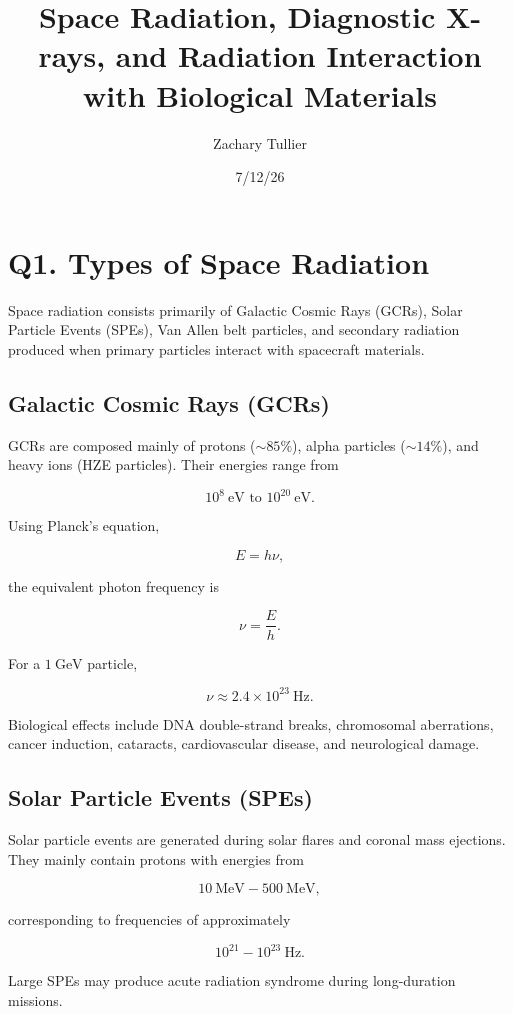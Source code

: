 \documentclass[12pt]{article}
\title{Space Radiation, Diagnostic X-rays, and Radiation Interaction with Biological Materials}
\author{Zachary Tullier}
\date{7/12/26}
\begin{document}
\maketitle

\section*{Q1. Types of Space Radiation}

Space radiation consists primarily of Galactic Cosmic Rays (GCRs), Solar Particle Events (SPEs), Van Allen belt particles, and secondary radiation produced when primary particles interact with spacecraft materials.

\subsection*{Galactic Cosmic Rays (GCRs)}

GCRs are composed mainly of protons ($\sim85\%$), alpha particles ($\sim14\%$), and heavy ions (HZE particles). Their energies range from

\[
10^8~\mathrm{eV} \text{ to } 10^{20}~\mathrm{eV}.
\]

Using Planck's equation,

\[
E=h\nu,
\]

the equivalent photon frequency is

\[
\nu=\frac{E}{h}.
\]

For a $1~\mathrm{GeV}$ particle,

\[
\nu\approx2.4\times10^{23}\ \mathrm{Hz}.
\]

Biological effects include DNA double-strand breaks, chromosomal aberrations, cancer induction, cataracts, cardiovascular disease, and neurological damage.

\subsection*{Solar Particle Events (SPEs)}

Solar particle events are generated during solar flares and coronal mass ejections. They mainly contain protons with energies from

\[
10~\mathrm{MeV} - 500~\mathrm{MeV},
\]

corresponding to frequencies of approximately

\[
10^{21}-10^{23}\ \mathrm{Hz}.
\]

Large SPEs may produce acute radiation syndrome during long-duration missions.
\end{document}
